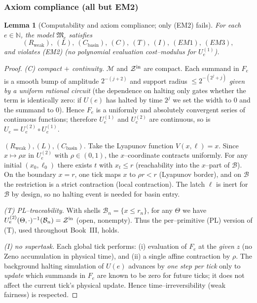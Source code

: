 \documentclass[12pt]{article}
\theoremstyle{definition}
\theoremstyle{plain}
\newtheorem{lemma}{Lemma}[section]
\begin{document}
\subsubsection*{Axiom compliance (all but \texorpdfstring{EM2}{EM2})}
\begin{lemma}[Computability and axiom compliance; only \textup{(EM2)} fails]
\label{lem:EM2-violation-computability}
For each $e\in\mathbb N$, the model $\mathfrak M_e$ satisfies
\[
  (R_{\text{weak}}),\ (L),\ (C_{\text{basin}}),\ (C),\ (T),\ (I),\ (EM1),\ (EM3),
\]
and violates \textup{(EM2)} (no polynomial evaluation cost–modulus for $U_e^{(1)}$).
\end{lemma}

\begin{proof}
\emph{(C) compact $+$ continuity.} $\mathcal M$ and $\mathcal Z^{\rm in}$ are compact. Each summand in $F_e$ is a smooth bump of amplitude $2^{-(j+2)}$ and support radius $\le 2^{-(2^{j}+j)}$ \emph{given by a uniform rational circuit} (the dependence on halting only gates whether the term is identically zero: if $U(e)$ has halted by time $2^{j}$ we set the width to $0$ and the summand to $0$). Hence $F_e$ is a uniformly and absolutely convergent series of continuous functions; therefore $U_e^{(1)}$ and $U_e^{(2)}$ are continuous, so is $U_e=U_e^{(2)}\!\circ U_e^{(1)}$.

\emph{$(R_{\text{weak}}), (L), (C_{\text{basin}})$.} Take the Lyapunov function $V(x,\ell)=x$. Since $x\mapsto \rho x$ in $U_e^{(2)}$ with $\rho\in(0,1)$, the $x$–coordinate contracts uniformly. For any initial $(x_0,\ell_0)$ there exists $t$ with $x_t\le r$ (reachability into the $x$–part of $\mathcal B$). On the boundary $x=r$, one tick maps $x$ to $\rho r<r$ (Lyapunov border), and on $\mathcal B$ the restriction is a strict contraction (local contraction). The latch $\ell$ is inert for $\mathcal B$ by design, so no halting event is needed for basin entry.

\emph{(T) PL–traceability.} With shells $\mathcal B_n=\{x\le r_n\}$, for any $\Theta$ we have $U_e^{(2)}(\Theta,\cdot)^{-1}(\mathcal B_n)=\mathcal Z^{\rm in}$ (open, nonempty). Thus the per–primitive (PL) version of (T), used throughout Book~III, holds.

\emph{(I) no supertask.} Each global tick performs: (i) evaluation of $F_e$ at the \emph{given} $z$ (no Zeno accumulation in physical time), and (ii) a single affine contraction by $\rho$. The background halting simulation of $U(e)$ advances by \emph{one step per tick} only to \emph{update} which summands in $F_e$ are known to be zero for future ticks; it does not affect the current tick’s physical update. Hence time–irreversibility (weak fairness) is respected.


\end{proof}
\end{document}
